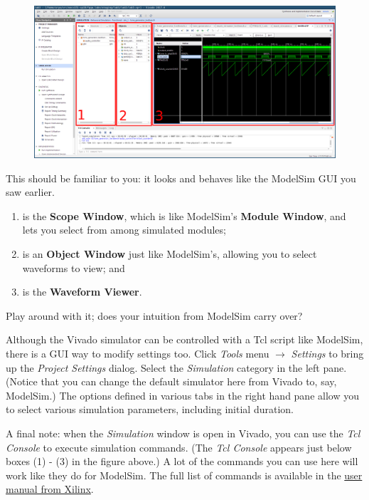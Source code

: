 \documentclass[11pt]{article}
\begin{document}
\begin{figure}[H]
	\centerline{\includegraphics[width=\textwidth]{figs/vivado_xsim.png}}
\end{figure}

This should be familiar to you: it looks and behaves like the ModelSim GUI you saw earlier.

\begin{enumerate}
  \item is the \textbf{Scope Window}, which is like ModelSim's \textbf{Module Window}, and lets you select from among simulated modules;
  \item is an \textbf{Object Window} just like ModelSim's, allowing you to select waveforms to view; and
  \item is the \textbf{Waveform Viewer}.
\end{enumerate}

Play around with it; does your intuition from ModelSim carry over?

Although the Vivado simulator can be controlled with a Tcl script like ModelSim, there is a GUI way to modify settings too. Click \emph{Tools} menu $\rightarrow$ \emph{Settings} to bring up the \emph{Project Settings} dialog. Select the \emph{Simulation} category in the left pane. (Notice that you can change the default simulator here from Vivado to, say, ModelSim.) The options defined in various tabs in the right hand pane allow you to select various simulation parameters, including initial duration.

A final note: when the \emph{Simulation} window is open in Vivado, you can use the \emph{Tcl Console} to execute simulation commands. (The \emph{Tcl Console} appears just below boxes (1) - (3) in the figure above.) A lot of the commands you can use here will work like they do for ModelSim. The full list of commands is available in the \href{https://www.xilinx.com/support/documentation/sw_manuals/xilinx2016_1/ug937-vivado-design-suite-simulation-tutorial.pdf}{user manual from Xilinx}.
\end{document}
